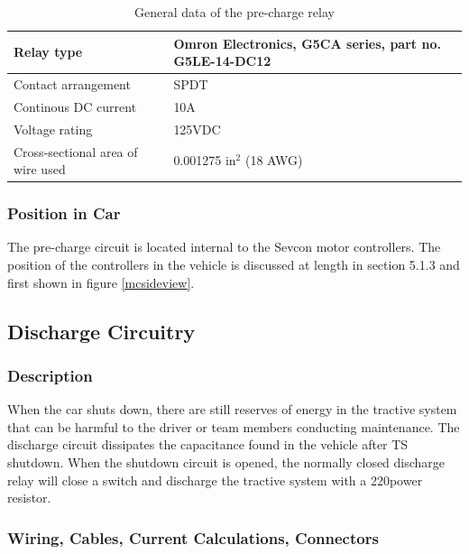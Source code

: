 \documentclass{article}
\begin{document}
            \begin{table}[H]
                \centering
                \begin{tabular}{|l|l|}
                \hline
                Relay type & Omron Electronics, G5CA series, part no. G5LE-14-DC12 \\ \hline
                Contact arrangement & SPDT \\ \hline
                Continous DC current & 10A \\ \hline
                Voltage rating & 125VDC \\ \hline
                Cross-sectional area of wire used & 0.001275 in$^{2}$ (18 AWG) \\ \hline
                \end{tabular}
                \caption{General data of the pre-charge relay}
                \label{PCrelay}
            \end{table}

        \subsubsection{Position in Car}

            The pre-charge circuit is located internal to the Sevcon motor controllers. The position of the controllers in the vehicle is discussed at length in section 5.1.3 and first shown in figure \ref{mcsideview}.

    \subsection{Discharge Circuitry}
    \label{dischargesection}

        \subsubsection{Description}

            When the car shuts down, there are still reserves of energy in the tractive system that can be harmful to the driver or team members conducting maintenance. The discharge circuit dissipates the capacitance found in the vehicle after TS shutdown. When the shutdown circuit is opened, the normally closed discharge relay will close a switch and discharge the tractive system with a 220\ohm  power resistor.

        \subsubsection{Wiring, Cables, Current Calculations, Connectors}
\end{document}

